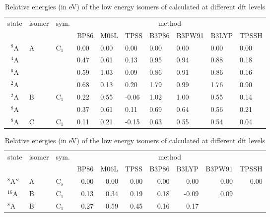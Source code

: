 \begin{refsection}
\begin{table}[h]
    \centering
    \small
	\caption{Relative energies (in eV) of the low energy isomers of  calculated at different \acrshort{dft} levels}
	\label{a7tbl:Cr3O5}
	\begin{tabular}{clllllllll}
		\hline
		\multirow{2}{*}{state} & \multirow{2}{*}{isomer} & \multirow{2}{*}{sym.} & \multicolumn{7}{c}{method}                          \\ \cline{4-10} 
			   &      &         & BP86 & M06L  & TPSS  & B3P86  & B3PW91 & B3LYP & TPSSH \\ \hline 
        $^8$A  & A    & C$_1$   & 0.00 & 0.00  & 0.00  & 0.00   & 0.00   & 0.00  & 0.00  \\
        $^4$A  &      &         & 0.47 & 0.61  & 0.13  & 0.95   & 0.94   & 0.88  & 0.18  \\
        $^6$A  &      &         & 0.59 & 1.03  & 0.09  & 0.86   & 0.91   & 0.86  & 0.16  \\
        $^2$A  &      &         & 0.68 & 0.13  & 0.20  & 1.79   & 0.99   & 1.76  & 0.90  \\
        $^2$A  & B    & C$_1$   & 0.22 & 0.55  & -0.06 & 1.02   & 1.00   & 0.55  & 0.14  \\
        $^8$A  &      &         & 0.37 & 0.61  & 0.11  & 0.69   & 0.64   & 0.56  & 0.21  \\
        $^8$A  & C    & C$_1$   & 0.11 & 0.21  & -0.15 & 0.63   & 0.55   & 0.54  & 0.04  \\ \hline
	\end{tabular}                               
\end{table}

\begin{table}[h]
    \centering
    \small
	\caption[Relative energies of of ]{Relative energies (in eV) of the low energy isomers of  calculated at different \acrshort{dft} levels}
	\label{a7tbl:Cr4O4}
	\begin{tabular}{lllrrrrrrr}
		\hline
		\multirow{2}{*}{state} & \multirow{2}{*}{isomer} & \multirow{2}{*}{sym.} & \multicolumn{7}{c}{method}\\ \cline{4-10} 
					   &      &        & BP86 & M06L & TPSS & B3P86 & B3LYP  & B3PW91  & TPSSH 	   \\ \hline
		$^8$A$''$      & A    & C$_s $ & 0.00 & 0.00 & 0.00 & 0.00  &  0.00  & 0.00    & 0.00  		\\
		$^{16}$A       & B    & C$_1 $ & 0.13 & 0.34 & 0.19 & 0.18  & -0.09  & 0.09    &       		\\
		$^8$A          & B    & C$_1 $ & 0.27 & 0.59 & 0.45 & 0.16  &  0.17  &         &       		\\ \hline
	\end{tabular}
\end{table}



\end{refsection}
